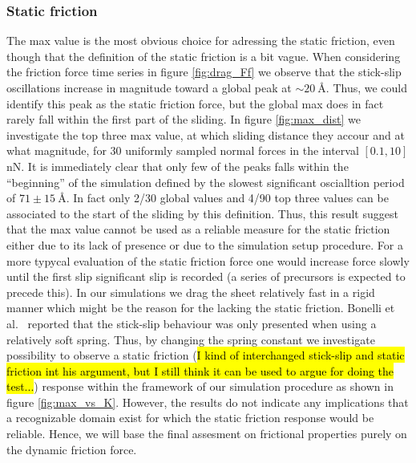\subsubsection{Static friction} 
The max value is the most obvious choice for adressing the static friction, even
though that the definition of the static friction is a bit vague. When
considering the friction force time series in figure \ref{fig:drag_Ff} we
observe that the stick-slip oscillations increase in magnitude toward a global
peak at $\sim \SI{20}{\text{Å}}$. Thus, we could identify this peak as the
static friction force, but the global max does in fact rarely fall within the
first part of the sliding. In figure \ref{fig:max_dist} we investigate the top
three max value, at which sliding distance they accour and at what magnitude,
for 30 uniformly sampled normal forces in the interval $[0.1, 10]$ nN. It is
immediately clear that only few of the peaks falls within the ``beginning'' of
the simulation defined by the slowest significant oscialltion period of $71\pm
\SI{15}{\text{Å}}$. In fact only 2/30 global values and 4/90 top three values
can be associated to the start of the sliding by this definition. Thus, this
result suggest that the max value cannot be used as a reliable measure for the
static friction either due to its lack of presence or due to the simulation
setup procedure. For a more typycal evaluation of the static friction force one
would increase force slowly until the first slip significant slip is recorded (a
series of precursors is expected to precede this). In our simulations we drag
the sheet relatively fast in a rigid manner which might be the reason for the lacking the static friction. Bonelli et al.\ \cite{bonelli_atomistic_2009} reported that the stick-slip behaviour was only presented when using a relatively soft spring. Thus, by changing the spring constant we investigate possibility to observe a static friction (\hl{I kind of interchanged stick-slip and static friction int his argument, but I still think it can be used to argue for doing the test...}) response within the framework of our simulation procedure as shown in
figure \ref{fig:max_vs_K}. However, the results do not indicate any implications
that a recognizable domain exist for which the static friction response would be
reliable. Hence, we will base the final assesment on frictional properties
purely on the dynamic friction force. 


